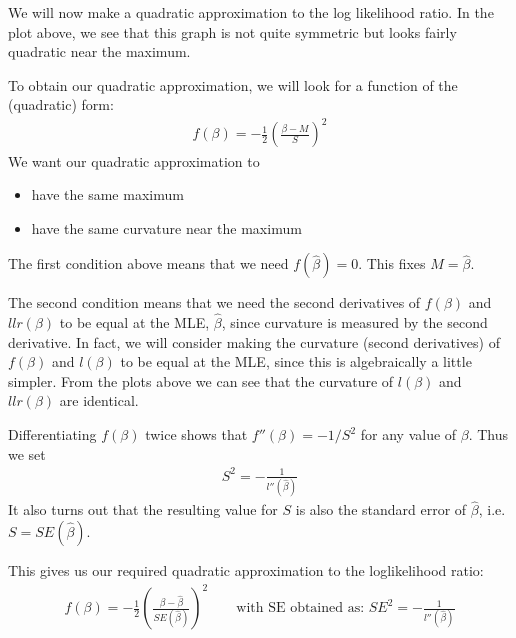 \documentclass[letterpaper,10pt,english]{jupyterBook}
\begin{document}
\sphinxAtStartPar
We will now make a quadratic approximation to the log likelihood ratio. In the plot above, we see that this graph is not quite symmetric but looks fairly quadratic near the maximum.

\sphinxAtStartPar
To obtain our quadratic approximation, we will look for a function of the (quadratic) form:
\begin{equation*}
\begin{split}
f(\beta) = -\frac{1}{2} \left( \frac{\beta - M}{S} \right)^2
\end{split}
\end{equation*}
\sphinxAtStartPar
We want our quadratic approximation to
\begin{itemize}
\item {} 
\sphinxAtStartPar
have the same maximum

\item {} 
\sphinxAtStartPar
have the same curvature near the maximum

\end{itemize}

\sphinxAtStartPar
The first condition above means that we need \(f(\hat{\beta}) = 0\). This fixes \(M = \hat{\beta}\).

\sphinxAtStartPar
The second condition means that we need the second derivatives of \(f(\beta)\) and \(llr(\beta)\) to be equal at the MLE, \(\hat{\beta}\), since curvature is measured by the second derivative. In fact, we will consider making the curvature (second derivatives) of \(f(\beta)\) and \(l(\beta)\) to be equal at the MLE, since this is algebraically a little simpler. From the plots above we can see that the curvature of \(l(\beta)\) and \(llr(\beta)\) are identical.

\sphinxAtStartPar
Differentiating \(f(\beta)\) twice shows that \(f''(\beta) = -1/S^2\) for any value of \(\beta\). Thus we set
\begin{equation*}
\begin{split}
S^2 = -\frac{1}{l''(\hat{\beta})}
\end{split}
\end{equation*}
\sphinxAtStartPar
It also turns out that the resulting value for \(S\) is also the standard error of \(\hat{\beta}\), i.e. \(S = SE(\hat{\beta})\).

\sphinxAtStartPar
This gives us our required quadratic approximation to the log\sphinxhyphen{}likelihood ratio:
\begin{equation*}
\begin{split}
f(\beta) = -\frac{1}{2} \left( \frac{\beta - \hat{\beta}}{SE(\hat{\beta})} \right)^2  \qquad  \text{with SE obtained as: } SE^2 = -\frac{1}{l''(\hat{\beta})}
\end{split}
\end{equation*}
\end{document}
